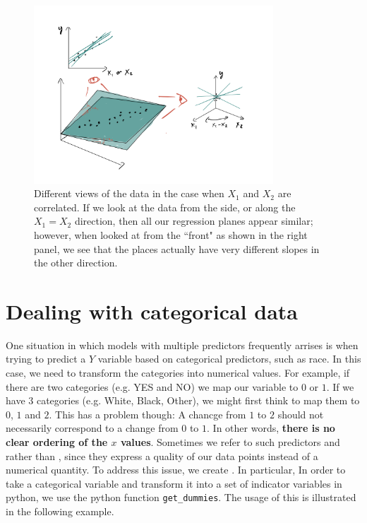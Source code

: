\begin{figure}[h]
    \centering
    \includegraphics[width=0.8\textwidth]{./../figures/sample_dist2}
    \caption{Different views of the data in the case when $X_1$ and $X_2$ are correlated. If we look at the data from the side, or along the $X_1=X_2$ direction, then all our regression planes appear similar; however, when looked at from the ``front" as shown in the right panel, we see that the places actually have very different slopes in the other direction.  }
    \label{fig:sample_dist2}
\end{figure}




\section{Dealing with categorical data}
 One situation in which models with multiple predictors frequently arrises is when trying to predict a $Y$ variable based on categorical predictors, such as race. In this case, we need to transform the categories  into numerical values. For example, if there are two categories (e.g. YES and NO) we map our variable to $0$ or $1$. If we have $3$ categories (e.g. White, Black, Other), we might first think to map them to $0$, $1$ and $2$. This has a problem though: A chancge from $1$ to $2$ should not necessarily  correspond to a change from $0$ to $1$. In other words, {\bf there is no clear ordering of the $x$ values}.  Sometimes we refer to such predictors and  rather than , since they express a quality of our data points instead of a numerical quantity. 
 To address this issue, we create . 
In particular, In order to take a categorical variable and transform it into a set of indicator variables in python, we use the python function \verb!get_dummies!. The usage of this is illustrated in the following example. 



